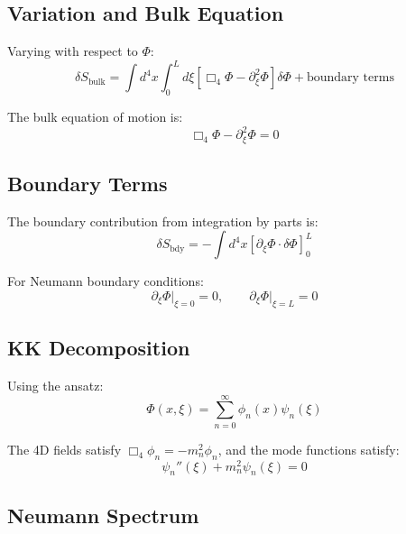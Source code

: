 \documentclass[11pt,a4paper]{article}
\theoremstyle{definition}
\theoremstyle{plain}
\theoremstyle{remark}
\begin{document}
\subsection{Variation and Bulk Equation}

Varying with respect to $\Phi$:
\begin{equation}
\delta S_{\mathrm{bulk}} = \int d^4x \int_0^L d\xi \left[ \Box_4\Phi - \partial_\xi^2\Phi \right]\delta\Phi + \text{boundary terms}
\label{eq:variation-bulk}
\end{equation}

The bulk equation of motion is:
\begin{equation}
\Box_4\Phi - \partial_\xi^2\Phi = 0
\label{eq:bulk-eom}
\end{equation}

\subsection{Boundary Terms}

The boundary contribution from integration by parts is:
\begin{equation}
\delta S_{\mathrm{bdy}} = -\int d^4x \left[ \partial_\xi\Phi \cdot \delta\Phi \right]_0^L
\label{eq:boundary-variation}
\end{equation}

For Neumann boundary conditions:
\begin{equation}
\partial_\xi\Phi\big|_{\xi=0} = 0, \qquad \partial_\xi\Phi\big|_{\xi=L} = 0
\label{eq:neumann-bc}
\end{equation}

\subsection{KK Decomposition}

Using the ansatz:
\begin{equation}
\Phi(x,\xi) = \sum_{n=0}^{\infty} \phi_n(x)\psi_n(\xi)
\label{eq:kk-ansatz}
\end{equation}

The 4D fields satisfy $\Box_4\phi_n = -m_n^2\phi_n$, and the mode functions satisfy:
\begin{equation}
\psi_n''(\xi) + m_n^2\psi_n(\xi) = 0
\label{eq:mode-eq}
\end{equation}

\subsection{Neumann Spectrum}
\end{document}
